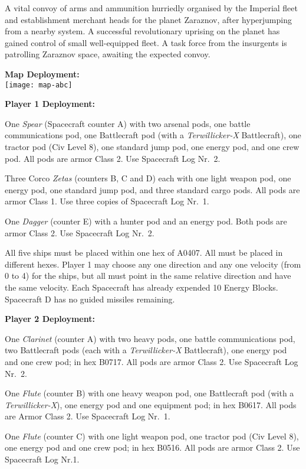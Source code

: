 A vital convoy of arms and ammunition hurriedly organised by the
Imperial fleet and establishment merchant heads for the planet
Zaraznov, after hyperjumping from a nearby system. A successful
revolutionary uprising on the planet has gained control of small
well-equipped fleet. A task force from the insurgents is patrolling
Zaraznov space, awaiting the expected convoy.

\textbf{Map Deployment:}\\
\texttt{[image: map-abc]}

\textbf{Player 1 Deployment:}

One \emph{Spear} (Spacecraft counter A) with two arsenal pods, one
battle communications pod, one Battlecraft pod (with a
\emph{Terwillicker-X} Battlecraft), one tractor pod (Civ Level 8), one
standard jump pod, one energy pod, and one crew pod. All pods are
armor Class 2.  Use Spacecraft Log Nr.~2.

Three Corco \emph{Zetas} (counters B, C and D) each with one light
weapon pod, one energy pod, one standard jump pod, and three standard
cargo pods. All pods are armor Class 1. Use three copies of Spacecraft
Log Nr.~1.

One \emph{Dagger} (counter E) with a hunter pod and an energy pod.
Both pods are armor Class 2. Use Spacecraft Log Nr.~2.

All five ships must be placed within one hex of A0407. All must be
placed in different hexes. Player 1 may choose any one direction and
any one velocity (from 0 to 4) for the ships, but all must point in
the same relative direction and have the same velocity. Each
Spacecraft has already expended 10 Energy Blocks. Spacecraft D has no
guided missiles remaining.

\textbf{Player 2 Deployment:}

One \emph{Clarinet} (counter A) with two heavy pods, one battle
communications pod, two Battlecraft pods (each with a
\emph{Terwillicker-X} Battlecraft), one energy pod and one crew pod;
in hex B0717. All pods are armor Class 2. Use Spacecraft Log Nr.~2.

One \emph{Flute} (counter B) with one heavy weapon pod, one
Battlecraft pod (with a \emph{Terwillicker-X}), one energy pod and one
equipment pod; in hex B0617. All pods are Armor Class 2. Use
Spacecraft Log Nr.~1.

One \emph{Flute} (counter C) with one light weapon pod, one tractor
pod (Civ Level 8), one energy pod and one crew pod; in hex B0516. All
pods are armor Class 2. Use Spacecraft Log Nr.1.

